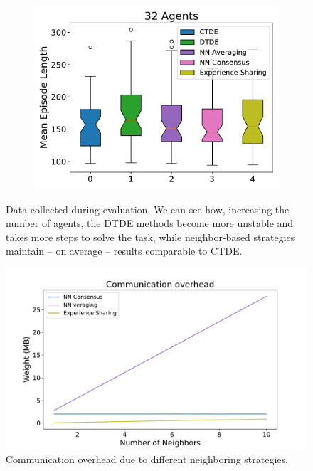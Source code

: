 \documentclass[sigconf]{acmart}
\begin{document}
\begin{figure}[htb]
\begin{subfigure}[b]{0.3\textwidth}
      \centering
      \includegraphics[width=\textwidth]{figures/mean-time-comparison-32-agents.pdf}
  \end{subfigure}
  \caption{ Data collected during evaluation.
  We can see how, increasing the number of agents, the DTDE methods become more unstable and takes more 
  steps to solve the task, while neighbor-based strategies maintain -- on average -- results comparable to CTDE.
  }
  \label{fig:time-eval}
\end{figure}

\begin{figure}
  \centering
  \includegraphics[width=1\linewidth]{figures/scalability.pdf}
  \caption{ Communication overhead due to different neighboring strategies.
  }
  \label{fig:scalability}
\end{figure}
\end{document}

